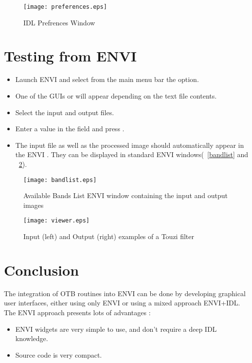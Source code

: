 \begin{figure}
\label{preferences}
\begin{center}
\texttt{[image: preferences.eps]}
\caption{IDL Prefrences Window}
\end{center}
\end{figure}



\section{Testing from ENVI}
\begin{itemize}
    \item Launch ENVI and select from the main menu bar the  option.
    \item One of the GUIs  or  will appear depending on the  text file contents. 
    \item Select the input and output files. 
    \item Enter a value in the  field and press .
    \item The input file as well as the processed image should automatically appear in the ENVI  . 
          They can be displayed in standard ENVI windows(~\ref{bandlist} and ~\ref{viewer}).
\end{itemize}

\begin{figure}
    \begin{minipage}[b]{.46\linewidth}
        \centering\texttt{[image: bandlist.eps]}
        \caption{ Available Bands List ENVI window containing the input and output images}
        \label{bandlist}
    \end{minipage} \hfill
    \begin{minipage}[b]{.46\linewidth}
        \centering\texttt{[image: viewer.eps]}
        \caption{Input (left) and Output (right)  examples of a Touzi filter}
        \label{viewer}
    \end{minipage}
\end{figure}

\section{Conclusion}
The integration of OTB routines into ENVI can be done by developing graphical user interfaces, either using only ENVI or using a mixed approach ENVI+IDL. 
The ENVI approach presents lots of advantages :
\begin{itemize}
    \item ENVI widgets are very simple to use, and don't require a deep IDL knowledge.
    \item Source code is very compact.
\end{itemize}

